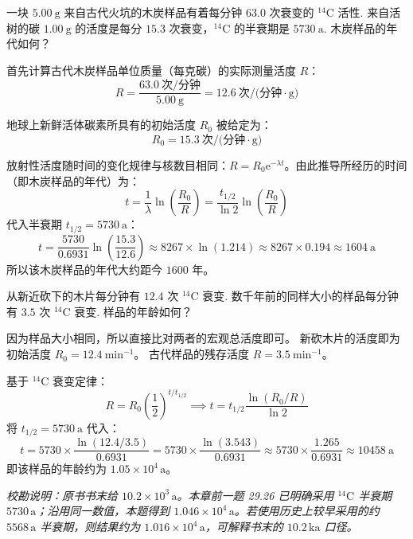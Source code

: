 \begin{exercise}\label{ex:29.26}
一块 $5.00 \ \mathrm{g}$ 来自古代火坑的木炭样品有着每分钟 $63.0$ 次衰变的 $^{14}\mathrm{C}$ 活性. 来自活树的碳 $1.00 \ \mathrm{g}$ 的活度是每分 $15.3$ 次衰变，$^{14}\mathrm{C}$ 的半衰期是 $5730 \ \mathrm{a}$. 木炭样品的年代如何？
\end{exercise}
\begin{solution}
首先计算古代木炭样品单位质量（每克碳）的实际测量活度 $R$：
$$ R = \frac{63.0 \ \text{次/分钟}}{5.00 \ \mathrm{g}} = 12.6 \ \text{次/(分钟}\cdot\mathrm{g)} $$

地球上新鲜活体碳素所具有的初始活度 $R_0$ 被给定为：
$$ R_0 = 15.3 \ \text{次/(分钟}\cdot\mathrm{g)} $$

放射性活度随时间的变化规律与核数目相同：$R = R_0 \mathrm{e}^{-\lambda t}$。由此推导所经历的时间（即木炭样品的年代）为：
$$ t = \frac{1}{\lambda} \ln \left( \frac{R_0}{R} \right) = \frac{t_{1/2}}{\ln 2} \ln \left( \frac{R_0}{R} \right) $$
代入半衰期 $t_{1/2} = 5730 \ \mathrm{a}$：
$$ t = \frac{5730}{0.6931} \ln \left( \frac{15.3}{12.6} \right) \approx 8267 \times \ln(1.214) \approx 8267 \times 0.194 \approx 1604 \ \mathrm{a} $$
所以该木炭样品的年代大约距今 $1600$ 年。
\end{solution}

\begin{exercise}\label{ex:29.27}
从新近砍下的木片每分钟有 $12.4$ 次 $^{14}\mathrm{C}$ 衰变. 数千年前的同样大小的样品每分钟有 $3.5$ 次 $^{14}\mathrm{C}$ 衰变. 样品的年龄如何？
\end{exercise}
\begin{solution}
因为样品大小相同，所以直接比对两者的宏观总活度即可。
新砍木片的活度即为初始活度 $R_0 = 12.4 \ \mathrm{min^{-1}}$。
古代样品的残存活度 $R = 3.5 \ \mathrm{min^{-1}}$。

基于 $^{14}\mathrm{C}$ 衰变定律：
$$ R = R_0 \left( \frac{1}{2} \right)^{t / t_{1/2}} \implies t = t_{1/2} \frac{\ln(R_0/R)}{\ln 2} $$
将 $t_{1/2} = 5730 \ \mathrm{a}$ 代入：
$$ t = 5730 \times \frac{\ln(12.4 / 3.5)}{0.6931} = 5730 \times \frac{\ln(3.543)}{0.6931} \approx 5730 \times \frac{1.265}{0.6931} \approx 10458 \ \mathrm{a} $$
即该样品的年龄约为 $1.05\times10^4\,\mathrm a$。

\textit{校勘说明：原书书末给 $10.2\times10^3\,\mathrm a$。本章前一题 29.26 已明确采用 $^{14}\mathrm C$ 半衰期 $5730\,\mathrm a$；沿用同一数值，本题得到 $1.046\times10^4\,\mathrm a$。若使用历史上较早采用的约 $5568\,\mathrm a$ 半衰期，则结果约为 $1.016\times10^4\,\mathrm a$，可解释书末的 $10.2\,\mathrm{ka}$ 口径。}
\end{solution}

